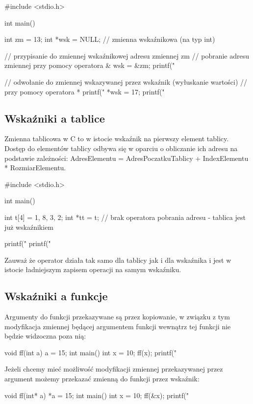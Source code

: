 \begin{CodeFrame*}[c]{}
#include <stdio.h>

int main() {
    int zm = 13;
    int *wsk = NULL; // zmienna wskaźnikowa (na typ int)
    
    // przypisanie do zmiennej wskaźnikowej adresu zmiennej zm
    // pobranie adresu zmiennej przy pomocy operatora &
    wsk = &zm;
    printf("%
    
    // odwołanie do zmiennej wskazywanej przez wskaźnik (wyłuskanie wartości)
    // przy pomocy operatora *
    printf("%
    *wsk = 17;
    printf("%
}
\end{CodeFrame*}

\subsection{Wskaźniki a tablice}

Zmienna tablicowa w C to w istocie wskaźnik na pierwszy element tablicy.
Dostęp do elementów tablicy odbywa się w oparciu o obliczanie ich adresu na podstawie zależności: AdresElementu = AdresPoczatkuTablicy + IndexElementu * RozmiarElementu.

\begin{CodeFrame*}[c]{}
#include <stdio.h>

int main() {
  int t[4] = {1, 8, 3, 2};
  int *tt = t; // brak operatora pobrania adresu - tablica jest już wskaźnikiem
  
  printf("%
  printf("%
}
\end{CodeFrame*}

Zauważ że operator  działa tak samo dla tablicy jak i dla wskaźnika i jest w istocie ładniejszym zapisem operacji  na samym wskaźniku.

\subsection{Wskaźniki a funkcje}
Argumenty do funkcji przekazywane są przez kopiowanie,
w związku z tym modyfikacja zmiennej będącej argumentem funkcji
wewnątrz tej funkcji nie będzie widzoczna poza nią:
\begin{CodeFrame*}[c]{}
void ff(int a) {
    a = 15;
}
int main() {
    int x = 10;
    ff(x);
    printf("%
}
\end{CodeFrame*}

Jeżeli chcemy mieć możliwość modyfikacji zmiennej przekazywanej
przez argument możemy przekazać zmienną do funkcji przez wskaźnik:
\begin{CodeFrame*}[c]{}
void ff(int* a) {
    *a = 15;
}
int main() {
    int x = 10;
    ff(&x);
    printf("%
}
\end{CodeFrame*}

